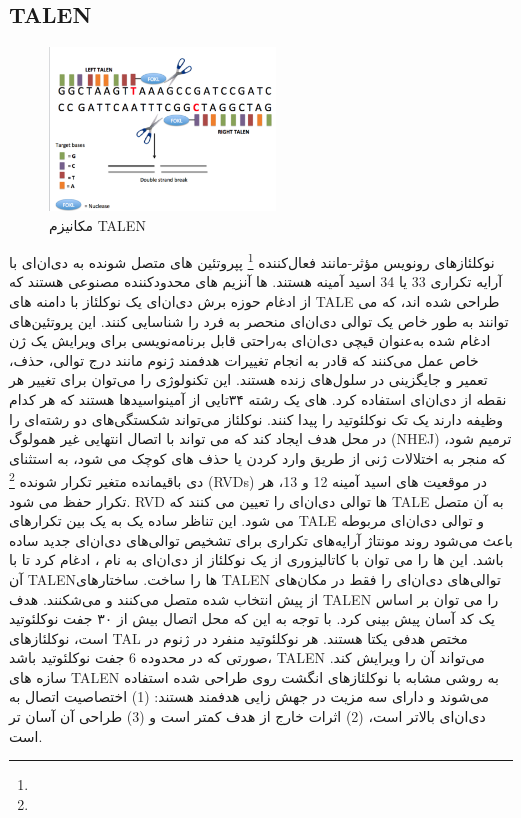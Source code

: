 \documentclass[12pt,a4paper,BCOR=.7cm,headsepline,bibliography=totoc]{report}
\begin{document}
\subsection{TALEN}
\begin{figure}
\centering
\includegraphics[width=6cm, ]{pictures/Overview_of_TALENs.png}
\caption{
مکانیزم TALEN \cite{graph3}
}\label{wrap-fig:4}
\end{figure}
نوکلئازهای رونویس مؤثر-مانند فعال‌کننده
\footnote{} 
 پپروتئین های متصل شونده به دی‌ان‌ای با آرایه تکراری 33 یا 34 اسید آمینه هستند.
ها آنزیم های محدودکننده مصنوعی هستند که از ادغام حوزه برش دی‌ان‌ای یک نوکلئاز با دامنه های TALE طراحی شده اند، که می توانند به طور خاص یک توالی دی‌ان‌ای منحصر به فرد را شناسایی کنند. این پروتئین‌های ادغام شده به‌عنوان قیچی دی‌ان‌ای به‌راحتی قابل برنامه‌نویسی برای ویرایش یک ژن خاص عمل می‌کنند که قادر به انجام تغییرات هدفمند ژنوم مانند درج توالی، حذف، تعمیر و جایگزینی در سلول‌های زنده هستند.\cite{TALEN1} این تکنولوژی را می‌توان برای تغییر هر نقطه از دی‌ان‌ای استفاده کرد.
 های
 یک رشته ۳۴تایی از آمینو‌اسید‌ها هستند که هر کدام وظیفه دارند یک تک نوکلئوتید را پیدا کنند. نوکلئاز می‌تواند شکستگی‌های دو رشته‌ای را در محل هدف ایجاد کند که می تواند با اتصال انتهایی غیر همولوگ (NHEJ) ترمیم شود، که منجر به اختلالات ژنی از طریق وارد کردن یا حذف های کوچک می شود، به استثنای دی باقیمانده متغیر تکرار شونده
\footnote{}
 (RVDs) در موقعیت های اسید آمینه 12 و 13، هر تکرار حفظ می شود. RVD ها توالی دی‌ان‌ای را تعیین می کنند که TALE به آن متصل می شود. این تناظر ساده یک به یک بین تکرارهای TALE و توالی دی‌ان‌ای مربوطه باعث می‌شود روند مونتاژ آرایه‌های تکراری برای تشخیص توالی‌های دی‌ان‌ای جدید ساده باشد. این 
ها
 را می توان با کاتالیزوری از یک نوکلئاز از دی‌ان‌ای به نام 
، ادغام کرد تا با آن TALENها را ساخت. ساختارهای TALEN توالی‌های دی‌ان‌ای را فقط در مکان‌های از پیش انتخاب شده متصل می‌کنند و می‌شکنند. هدف TALEN را می توان بر اساس یک کد آسان پیش بینی کرد. با توجه به این که محل اتصال بیش از ۳۰ جفت نوکلئوتید است، نوکلئازهای TAL مختص هدفی یکتا هستند. هر نوکلئوتید منفرد در ژنوم در صورتی که در محدوده 6 جفت نوکلئوتید باشد، TALEN می‌تواند آن را ویرایش کند.
سازه های TALEN به روشی مشابه با نوکلئازهای انگشت روی طراحی شده استفاده می‌شوند و دارای سه مزیت در جهش زایی هدفمند هستند: (1) اختصاصیت اتصال به دی‌ان‌ای بالاتر است، (2) اثرات خارج از هدف کمتر است و (3) طراحی آن آسان تر است.\cite{TALEN2}
\end{document}
